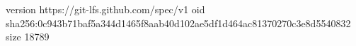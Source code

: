 version https://git-lfs.github.com/spec/v1
oid sha256:0c943b71baf5a344d1465f8aab40d102ae5df1d464ac81370270c3e8d5540832
size 18789

